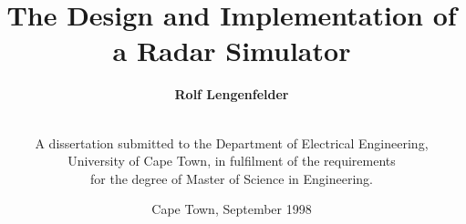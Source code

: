 \documentclass[12pt,thmsa,a4paper,oneside]{report}
\begin{document}
\title{\textbf{The Design and Implementation of a Radar Simulator}\\
\vspace{1.4in}}
\author{\textbf{Rolf Lengenfelder} \and \vspace{0.2in} \\
A dissertation submitted to the Department of Electrical Engineering,\\
University of Cape Town, in fulfilment of the requirements\\
for the degree of Master of Science in Engineering.\\
\vspace{0.1in}}
\date{Cape Town, September 1998}
\maketitle

%

%

%

%

%

%

%

%

\newpage

%

%

%
\end{document}
